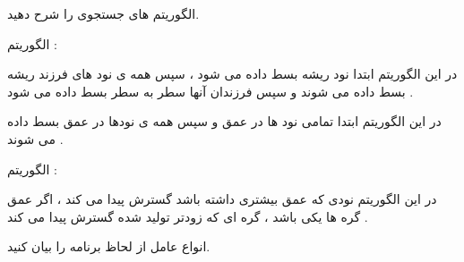 \documentclass[12pt]{article}
\begin{document}
\vspace{20pt}
\noindent
الگوریتم های جستجوی
 را شرح دهید.



\begin{tcolorbox}
الگوریتم 
  : 
 
 در این الگوریتم ابتدا نود ریشه بسط داده می شود ، سپس همه ی نود های فرزند ریشه بسط داده می شوند و سپس فرزندان آنها سطر به سطر بسط داده می شود .
 
 در این الگوریتم ابتدا تمامی نود ها در عمق 
 و سپس همه ی نودها  در عمق
 بسط داده می شوند .
 
 
 \vspace{20pt}
 
 الگوریتم
   : 
  
  در این الگوریتم نودی که عمق بیشتری داشته باشد گسترش پیدا می کند ، اگر عمق گره ها یکی باشد ، گره ای که زودتر تولید شده گسترش پیدا می کند .

\end{tcolorbox}


\newpage
\vspace{20pt}
\noindent
انواع عامل از لحاظ برنامه را بیان کنید.
\end{document}
